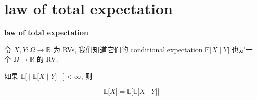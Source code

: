 \documentclass{qlnotes-export}
\begin{document}
\section{law of total expectation}\label{law-of-total-expectation}

\begin{theorem}{\protect{}\label{kn-law-of-total-expectation}{\textbf{law
of total expectation}}}

令 \(X,Y:\Omega\rightarrow{\mathbb{R}}\) 为 RVs, 我们知道它们的 conditional expectation \(\left. {\mathbb{E}}\lbrack X \middle| Y\rbrack \right.\) 也是一个 \(\Omega\rightarrow{\mathbb{R}}\) 的 RV.

如果 \(\left. {\mathbb{E}}\lbrack \middle| {\mathbb{E}}\lbrack X \middle| Y\rbrack \middle| \rbrack < \infty \right.\), 则

\[\left. {\mathbb{E}}\lbrack X\rbrack = {\mathbb{E}}\lbrack{\mathbb{E}}\lbrack X \middle| Y\rbrack\rbrack \right.\]

\end{theorem}
\end{document}
